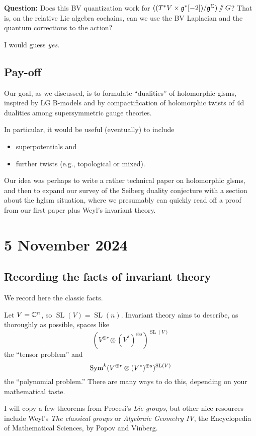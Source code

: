\documentclass[11pt]{amsart}
\DeclareMathOperator{\SL}{SL}
\begin{document}
{\bf Question:} Does this BV quantization work for $((T^* V \times \mathfrak g^*[-2])/\mathfrak g^\Sigma)\mathbin{/\mkern-6mu/} G$? That is, on the relative Lie algebra cochains, can we use the BV Laplacian and the quantum corrections to the action?

I would guess {\it yes}.

\subsection{Pay-off}

Our goal, as we discussed, is to formulate ``dualities'' of holomorphic glsms, 
inspired by LG B-models and by compactification of holomorphic twists of 4d dualities among supersymmetric gauge theories.

In particular, it would be useful (eventually) to include
\begin{itemize}
\item superpotentials and
\item further twists (e.g., topological or mixed).
\end{itemize}
Our idea was perhaps to write a rather technical paper on holomorphic glsms, 
and then to expand our survey of the Seiberg duality conjecture with a section about the hglsm situation, where we presumably can quickly read off a proof from our first paper plus Weyl's invariant theory. 

\section{5 November 2024}

\subsection{Recording the facts of invariant theory}

We record here the classic facts.

Let $V = \mathbb C^n$, so $\SL(V) = \SL(n)$. 
Invariant theory aims to describe, as thoroughly as possible, spaces like
\[
(V^{\otimes r} \otimes (V^*)^{\otimes s})^{\SL(V)}
\]
the ``tensor problem'' and
\[
\Sym^k(V^{\oplus r} \otimes (V^*)^{\oplus s})^{\SL(V)}
\]
the ``polynomial problem.''
There are many ways to do this, depending on your mathematical taste.

I will copy a few theorems from Procesi's {\it Lie groups}, but other nice resources include Weyl's {\it The classical groups} or {\it Algebraic Geometry IV}, the Encyclopedia of Mathematical Sciences, by Popov and Vinberg.
\end{document}
